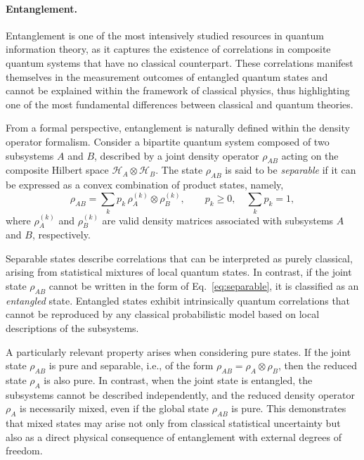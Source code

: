 \paragraph{Entanglement.}
Entanglement is one of the most intensively studied resources in quantum information theory, as it captures the existence of correlations in composite quantum systems that have no classical counterpart. These correlations manifest themselves in the measurement outcomes of entangled quantum states and cannot be explained within the framework of classical physics, thus highlighting one of the most fundamental differences between classical and quantum theories.

From a formal perspective, entanglement is naturally defined within the density operator formalism. Consider a bipartite quantum system composed of two subsystems $A$ and $B$, described by a joint density operator $\rho_{AB}$ acting on the composite Hilbert space $\mathcal{H}_A \otimes \mathcal{H}_B$. The state $\rho_{AB}$ is said to be \emph{separable} if it can be expressed as a convex combination of product states, namely,
\begin{equation}
    \label{eq:separable}
    \rho_{AB} = \sum_k p_k\, \rho_A^{(k)} \otimes \rho_B^{(k)},
    \qquad p_k \geq 0, \quad \sum_k p_k = 1,
\end{equation}
where $\rho_A^{(k)}$ and $\rho_B^{(k)}$ are valid density matrices associated with subsystems $A$ and $B$, respectively.

Separable states describe correlations that can be interpreted as purely classical, arising from statistical mixtures of local quantum states. In contrast, if the joint state $\rho_{AB}$ cannot be written in the form of Eq.~\eqref{eq:separable}, it is classified as an \emph{entangled} state. Entangled states exhibit intrinsically quantum correlations that cannot be reproduced by any classical probabilistic model based on local descriptions of the subsystems.

A particularly relevant property arises when considering pure states. If the joint state $\rho_{AB}$ is pure and separable, i.e., of the form $\rho_{AB} = \rho_A \otimes \rho_B$, then the reduced state $\rho_A$ is also pure. In contrast, when the joint state is entangled, the subsystems cannot be described independently, and the reduced density operator $\rho_A$ is necessarily mixed, even if the global state $\rho_{AB}$ is pure. This demonstrates that mixed states may arise not only from classical statistical uncertainty but also as a direct physical consequence of entanglement with external degrees of freedom.

